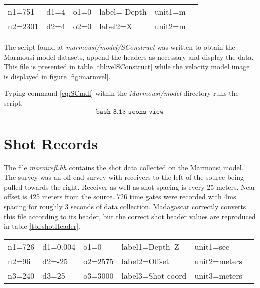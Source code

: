{
\begin{tabular}{|llllll|}
        \hline        
    n1=751    &     d1=4   &        o1=0  &        label= Depth & unit1=m &  \\ 
    n2=2301   &     d2=4   &        o2=0  &        label2=X     & unit2=m &  \\
	\hline
\end{tabular}
}

The script found at \emph{marmousi/model/SConstruct} was written to obtain the Marmousi model datasets, append the headers as necessary and display the  data.  This file is presented in table \ref{tbl:velSConstruct} while the velocity model image is displayed in figure \ref{fig:marmvel}.
 
{
\tiny

\normalsize
}


Typing command \ref{eq:SCmdl} within the \emph{Marmousi\slash model} directory runs the script.
\begin{equation}\label{eq:SCmdl} \texttt{bash-3.1\$\ scons\ view} \end{equation}


\section{Shot Records}
The file \emph{marmrefl.hh} contains the shot data collected on the Marmousi model.  The survey was an off end survey with receivers to the left of the source being pulled towards the right.  Receiver as well as shot spacing is every 25 meters.  Near offset is 425 meters from the source.  726 time gates were recorded with 4ms spacing for roughly 3 seconds of data collection.  Madagascar correctly converts this file according to its header, but the correct shot header values are reproduced in table \ref{tbl:shotHeader}.   

{
	\begin{tabular}{|llllll|}
	\hline  
	    n1=726 &  d1=0.004 &  o1=0     &  label1=Depth\ Z   &   unit1=sec     & \\
    	    n2=96  &  d2=-25   &  o2=2575  &  label2=Offset     &   unit2=meters  & \\
            n3=240 &  d3=25    &  o3=3000  &  label3=Shot-coord &   unit3=meters  & \\
	\hline
	\end{tabular}
}

